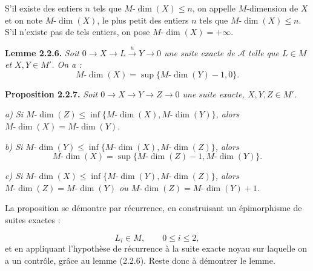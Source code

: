 \clearpage
{}%
\begingroup\small\setlength{\parskip}{0pt}\setlength{\emergencystretch}{1.5em}
\setlength{\abovedisplayskip}{4pt plus 2pt minus 2pt}%
\setlength{\belowdisplayskip}{4pt plus 2pt minus 2pt}%

S'il existe des entiers $n$ tels que $M\text{-}\dim(X)\leq n$, on appelle
$M$-dimension de $X$ et on note $M\text{-}\dim(X)$, le plus petit des
entiers $n$ tels que $M\text{-}\dim(X)\leq n$. S'il n'existe pas de tels
entiers, on pose $M\text{-}\dim(X)=+\infty$.

\medskip\noindent\textbf{Lemme 2.2.6.}\quad
\textit{Soit
$0\longrightarrow X\longrightarrow L\xrightarrow{u}Y\longrightarrow0$
une suite exacte de $\mathcal A$ telle que $L\in M$ et $X,Y\in M'$. On a :}
\[
M\text{-}\dim(X)=\sup\{M\text{-}\dim(Y)-1,0\}.
\]

\medskip\noindent\textbf{Proposition 2.2.7.}\quad
\textit{Soit
$0\longrightarrow X\longrightarrow Y\longrightarrow Z\longrightarrow0$
une suite exacte, $X,Y,Z\in M'$.}

\noindent\textit{a) Si
$M\text{-}\dim(Z)\leq
\inf\{M\text{-}\dim(X),M\text{-}\dim(Y)\}$, alors
$M\text{-}\dim(X)=M\text{-}\dim(Y)$.}

\noindent\textit{b) Si
$M\text{-}\dim(Y)\leq
\inf\{M\text{-}\dim(X),M\text{-}\dim(Z)\}$, alors}
\[
M\text{-}\dim(X)=
\sup\{M\text{-}\dim(Z)-1,M\text{-}\dim(Y)\}.
\]

\noindent\textit{c) Si
$M\text{-}\dim(X)\leq
\inf\{M\text{-}\dim(Y),M\text{-}\dim(Z)\}$, alors
$M\text{-}\dim(Z)=M\text{-}\dim(Y)$ ou
$M\text{-}\dim(Z)=M\text{-}\dim(Y)+1$.}

La proposition se démontre par récurrence, en construisant un épimorphisme
de suites exactes :

\begin{center}
\end{center}
\[
L_i\in M,\qquad 0\leq i\leq2,
\]
et en appliquant l'hypothèse de récurrence à la suite exacte noyau sur
laquelle on a un contrôle, grâce au lemme (2.2.6). Reste donc à démontrer
le lemme.

